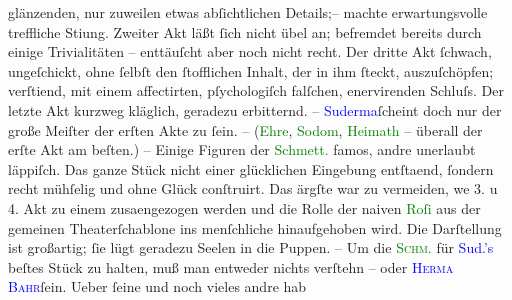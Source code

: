                glänzenden, nur zuweilen etwas abſichtlichen Details;– machte erwartungsvolle
               treffliche Sti{\geminationm}ung. Zweiter Akt läßt ſich nicht übel an;
               befremdet bereits durch einige Trivialitäten – enttäuſcht aber noch nicht recht. Der
               dritte Akt {\pb}ſchwach, ungeſchickt, ohne ſelbſt den
               ſtofflichen Inhalt, der in ihm ſteckt, auszuſchöpfen; verſti{\geminationm}end, mit einem affectirten, pſychologiſch falſchen,
               enervirenden Schluſs. Der letzte Akt kurzweg kläglich, geradezu erbitternd. – \textcolor{blue}{Suderma{\geminationn}}{}\ledrightnote{\textcolor{blue}{Hermann Sudermann}}{ }ſcheint doch nur der große Meiſter der erſten Akte
               zu ſein. – (\textcolor{green}{Ehre}{}\ledrightnote{\textcolor{green}{Die Ehre}}, \textcolor{green}{Sodom}{}\ledrightnote{\textcolor{green}{Sodom’s Ende}}, \textcolor{green}{Heimath}{}\ledrightnote{\textcolor{green}{Heimat}} – {\pb}überall der erſte Akt am beſten.) – Einige Figuren der
                  \textcolor{green}{Schmett.}{}\ledrightnote{\textcolor{green}{Die Schmetterlingsschlacht}} famos, andre unerlaubt läppiſch. Das
               ganze Stück nicht einer glücklichen Eingebung entſta{\geminationm}end, ſondern recht mühſelig und ohne Glück conſtruirt. Das ärgſte war zu vermeiden,
                  we{\geminationn} 3. u 4. Akt zu einem zusa{\geminationm}enge{\pb}zogen werden und
               die Rolle der naiven \textcolor{green}{Roſi}{} aus der
               gemeinen Theaterſchablone ins menſchliche hinaufgehoben wird. Die Darſtellung ist
               großartig; ſie lügt geradezu Seelen in die Puppen. – Um die \textcolor{green}{\textsc{Schm}.}{}\ledrightnote{\textcolor{green}{Die Schmetterlingsschlacht}} für \textcolor{blue}{Sud.’s}{}\ledrightnote{\textcolor{blue}{Hermann Sudermann}} beſtes Stück zu halten, muß man entweder nichts verſtehn – oder \textcolor{blue}{\textsc{Herma{\geminationn}{ }{\pb}Bahr}}{}\ledrightnote{\textcolor{blue}{Hermann Bahr}}{ }ſein. Ueber ſeine \label{K_L00387_1v}\label{K_L00387_1h} und noch vieles andre hab
